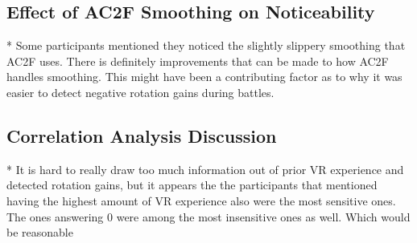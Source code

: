 \subsection{Effect of AC2F Smoothing on Noticeability}
* Some participants mentioned they noticed the slightly slippery smoothing that AC2F uses. There is definitely improvements that can be made to how AC2F handles smoothing. This might have been a contributing factor as to why it was easier to detect negative rotation gains during battles. 
\subsection{Correlation Analysis Discussion}
* It is hard to really draw too much information out of prior VR experience and detected rotation gains, but it appears the the participants that mentioned having the highest amount of VR experience also were the most sensitive ones. The ones answering 0 were among the most insensitive ones as well. Which would be reasonable
